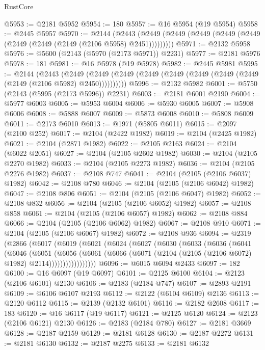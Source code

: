 \begin{lexlean}{RustCore}
\begin{coremodule}
@5953 := @2181 @5952
@5954 := 180
@5957 := @16 @5954 (@19 @5954)
@5958 := @2445 @5957
@5970 := @2144
    (@2443 (@2449 (@2449 (@2449 (@2449 (@2449 (@2449 (@2449 (@2149 (@2106 @5958) @2451)))))))))
@5971 := @2132 @5958
@5976 := @5600 (@2143 (@5970 (@2173 @5971)) @2231)
@5977 := @2181 @5976
@5978 := 181
@5981 := @16 @5978 (@19 @5978)
@5982 := @2445 @5981
@5995 := @2144
    (@2443
      (@2449 (@2449 (@2449 (@2449 (@2449 (@2449 (@2449 (@2449 (@2149 (@2106 @5982) @2450))))))))))
@5996 := @2132 @5982
@6001 := @5750 (@2143 (@5995 (@2173 @5996)) @2231)
@6003 := @2181 @6001 @2190
@6004 := @5977 @6003
@6005 := @5953 @6004
@6006 := @5930 @6005
@6007 := @5908 @6006
@6008 := @5888 @6007
@6009 := @5873 @6008
@6010 := @5808 @6009
@6011 := @2173 @6010
@6013 := @1971 (@5805 @6011)
@6015 := @2097 (@2100 @252)
@6017 := @2104 (@2422 @1982)
@6019 := @2104 (@2425 @1982)
@6021 := @2104 (@2871 @1982)
@6022 := @2105 @2163
@6024 := @2104 (@6022 @2051)
@6027 := @2104 (@2105 @2602 @1982)
@6030 := @2104 (@2105 @2270 @1982)
@6033 := @2104 (@2105 @2273 @1982)
@6036 := @2104 (@2105 @2276 @1982)
@6037 := @2108 @747
@6041 := @2104 (@2105 (@2106 @6037) @1982)
@6042 := @2108 @780
@6046 := @2104 (@2105 (@2106 @6042) @1982)
@6047 := @2108 @806
@6051 := @2104 (@2105 (@2106 @6047) @1982)
@6052 := @2108 @832
@6056 := @2104 (@2105 (@2106 @6052) @1982)
@6057 := @2108 @858
@6061 := @2104 (@2105 (@2106 @6057) @1982)
@6062 := @2108 @884
@6066 := @2104 (@2105 (@2106 @6062) @1982)
@6067 := @2108 @910
@6071 := @2104 (@2105 (@2106 @6067) @1982)
@6072 := @2108 @936
@6094 := @2319
    (@2866
      (@6017
        (@6019
          (@6021
            (@6024
              (@6027
                (@6030
                  (@6033
                    (@6036
                      (@6041
                        (@6046
                          (@6051
                            (@6056
                              (@6061
                                (@6066
                                  (@6071 (@2104 (@2105 (@2106 @6072) @1982) @2114)))))))))))))))))
@6096 := @6015 @6094 @2433
@6097 := 182
@6100 := @16 @6097 (@19 @6097)
@6101 := @2125 @6100
@6104 := @2123 (@2106 @6101) @2130
@6106 := @2183 (@2184 @747)
@6107 := @2893 @2191
@6109 := @6106 @6107 @2193
@6112 := @2122 (@6104 @6109) @2136
@6113 := @2120 @6112
@6115 := @2139 (@2132 @6101)
@6116 := @2182 @2608
@6117 := 183
@6120 := @16 @6117 (@19 @6117)
@6121 := @2125 @6120
@6124 := @2123 (@2106 @6121) @2130
@6126 := @2183 (@2184 @780)
@6127 := @2181 @3669
@6128 := @2187 @2159
@6129 := @2181 @6128
@6130 := @2187 @2272
@6131 := @2181 @6130
@6132 := @2187 @2275
@6133 := @2181 @6132

\end{coremodule}
\end{lexlean}
